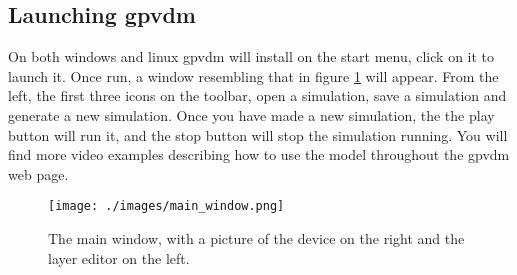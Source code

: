 \subsection{Launching gpvdm}
On both windows and linux gpvdm will install on the start menu, click on it to launch it.  Once run, a window resembling that in figure \ref{fig:mainwindow} will appear.  From the left, the first three icons on the toolbar, open a simulation, save a simulation and generate a new simulation.  Once you have made a new simulation, the the play button will run it, and the stop button will stop the simulation running.  You will find more video examples describing how to use the model throughout the gpvdm web page.

\begin{figure}
\centering
\texttt{[image: ./images/main\_window.png]}
\caption{The main window, with a picture of the device on the right and the layer editor on the left.}
\label{fig:mainwindow}
\end{figure}
